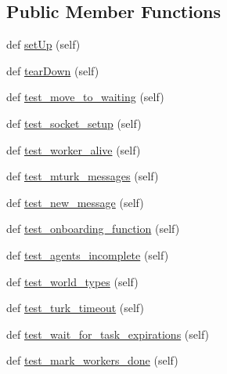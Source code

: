 \subsection*{Public Member Functions}
\begin{DoxyCompactItemize}
\item 
def \hyperlink{classparlai_1_1mturk_1_1core_1_1test_1_1test__mturk__manager_1_1TestMTurkManagerUnitFunctions_af930e15dfec4de7c1b07b286ad2a4e07}{set\+Up} (self)
\item 
def \hyperlink{classparlai_1_1mturk_1_1core_1_1test_1_1test__mturk__manager_1_1TestMTurkManagerUnitFunctions_a183e557fc6a0cc8e9942df9d9fb02445}{tear\+Down} (self)
\item 
def \hyperlink{classparlai_1_1mturk_1_1core_1_1test_1_1test__mturk__manager_1_1TestMTurkManagerUnitFunctions_a178934378f2db3695c5999caccabd675}{test\+\_\+move\+\_\+to\+\_\+waiting} (self)
\item 
def \hyperlink{classparlai_1_1mturk_1_1core_1_1test_1_1test__mturk__manager_1_1TestMTurkManagerUnitFunctions_a7ceaedc34a74f15a15c1f655038af139}{test\+\_\+socket\+\_\+setup} (self)
\item 
def \hyperlink{classparlai_1_1mturk_1_1core_1_1test_1_1test__mturk__manager_1_1TestMTurkManagerUnitFunctions_a16cf4a9ae131a9c6bae2bcc07d804553}{test\+\_\+worker\+\_\+alive} (self)
\item 
def \hyperlink{classparlai_1_1mturk_1_1core_1_1test_1_1test__mturk__manager_1_1TestMTurkManagerUnitFunctions_ab55e425b326e7f06365263ab155ae02c}{test\+\_\+mturk\+\_\+messages} (self)
\item 
def \hyperlink{classparlai_1_1mturk_1_1core_1_1test_1_1test__mturk__manager_1_1TestMTurkManagerUnitFunctions_a6f4fb740af7a113e939b7db9979aac45}{test\+\_\+new\+\_\+message} (self)
\item 
def \hyperlink{classparlai_1_1mturk_1_1core_1_1test_1_1test__mturk__manager_1_1TestMTurkManagerUnitFunctions_ab68de0fee2d4992a86b48994f0fa850c}{test\+\_\+onboarding\+\_\+function} (self)
\item 
def \hyperlink{classparlai_1_1mturk_1_1core_1_1test_1_1test__mturk__manager_1_1TestMTurkManagerUnitFunctions_a29a5b916e9a3ac35c05e5b8d87e9b990}{test\+\_\+agents\+\_\+incomplete} (self)
\item 
def \hyperlink{classparlai_1_1mturk_1_1core_1_1test_1_1test__mturk__manager_1_1TestMTurkManagerUnitFunctions_ae23e0218e51023445d2dc096086205c0}{test\+\_\+world\+\_\+types} (self)
\item 
def \hyperlink{classparlai_1_1mturk_1_1core_1_1test_1_1test__mturk__manager_1_1TestMTurkManagerUnitFunctions_a7bf3c2117a8b24385602fd550626a6f7}{test\+\_\+turk\+\_\+timeout} (self)
\item 
def \hyperlink{classparlai_1_1mturk_1_1core_1_1test_1_1test__mturk__manager_1_1TestMTurkManagerUnitFunctions_a5d1bc0457f0f695982606756490050ee}{test\+\_\+wait\+\_\+for\+\_\+task\+\_\+expirations} (self)
\item 
def \hyperlink{classparlai_1_1mturk_1_1core_1_1test_1_1test__mturk__manager_1_1TestMTurkManagerUnitFunctions_a3eb6343f438b2bc7dcedee55c68363ad}{test\+\_\+mark\+\_\+workers\+\_\+done} (self)
\end{DoxyCompactItemize}
